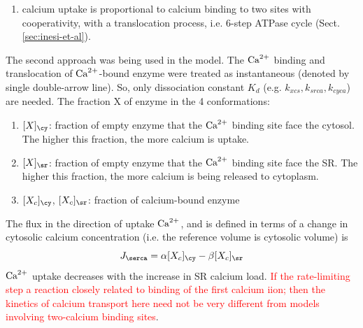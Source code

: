 \begin{enumerate}
\begin{enumerate}
    \item calcium uptake is proportional to calcium binding to two sites with
    cooperativity, with a translocation process, i.e. 6-step ATPase cycle
    \citep{inesi1980} (Sect.\ref{sec:inesi-et-al}).
  \end{enumerate}
  The second approach was being used in the model. The ${\text{Ca}^{2+}}$ binding and
  translocation of ${\text{Ca}^{2+}}$-bound enzyme were treated as instantaneous (denoted by
  single double-arrow line). So, only dissociation constant $K_d$ (e.g.
  $k_{xcs}, k_{srca}, k_{cyca}$) are needed.
  The fraction X of enzyme in the 4 conformations:
  \begin{enumerate}
  \item $[X]_\cy$: fraction of empty enzyme that the ${\text{Ca}^{2+}}$ binding
    site face the cytosol. The higher this fraction, the more calcium is uptake.
    
  \item $[X]_\sr$: fraction of empty enzyme that the ${\text{Ca}^{2+}}$ binding
    site face the SR. The higher this fraction, the more calcium is being
    released to cytoplasm. 
  \item $[X_c]_\cy$, $[X_c]_\sr$: fraction of calcium-bound enzyme
  \end{enumerate}
The flux in the direction of uptake ${\text{Ca}^{2+}}$, and is defined in terms of a change
in cytosolic calcium concentration (i.e. the reference volume is cytosolic
volume) is
  \begin{equation}
    \label{eq:1416}
    J_\serca = \alpha [X_c]_\cy - \beta [X_c]_\sr
  \end{equation}
 ${\text{Ca}^{2+}}$ uptake decreases with the increase in SR calcium load. \textcolor{red}{If
 the rate-limiting step a reaction closely related to binding of the first calcium
 iion; then the kinetics of calcium transport here need not be very different
 from models involving two-calcium binding sites}.
  

\end{enumerate}
